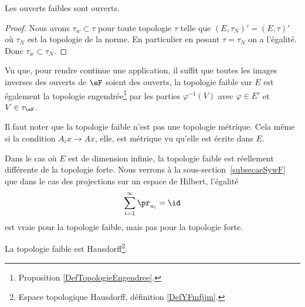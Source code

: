\begin{lemma}	\label{LEMooZPJNooJyaeAC}
	Les ouverts faibles sont ouverts.
\end{lemma}

\begin{proof}
	Nous avons \( \tau_w\subset \tau\) pour toute topologie \( \tau \) telle que \( (E,\tau_N)'=(E,\tau)'\) où \( \tau_N\) est la topologie de la norme. En particulier en posant \( \tau=\tau_N\) on a l'égalité. Donc \( \tau_w\subset\tau_N\).
\end{proof}

Vu que, pour rendre continue une application, il suffit que toutes les images inverses des ouverts de \( \eF\) soient des ouverts, la topologie faible sur \( E\) est également la topologie engendrée\footnote{Proposition \ref{DefTopologieEngendree}.} par les parties \( \varphi^{-1}(V)\) avec \( \varphi\in E'\) et \( V\in \tau_{\eF}\).

\begin{remark}
	Il faut noter que la topologie faible n'est pas une topologie métrique. Cela même si la condition \( A_ix\to Ax\), elle, est métrique vu qu'elle est écrite dans \( E\).

	Dans le cas où \( E\) est de dimension infinie, la topologie faible est réellement différente de la topologie forte. Nous verrons à la sous-section~\ref{subsecaeSywF} que dans le cas des projections sur un espace de Hilbert, l'égalité
	\begin{equation}
		\sum_{i=1}^{\infty}\pr_{u_i}=\id
	\end{equation}
	est vraie pour la topologie faible, mais pas pour la topologie forte.
\end{remark}

\begin{lemma}
	La topologie faible est Hausdorff\footnote{Espace topologique Hausdorff, définition \ref{DefYFmfjjm}.}.
\end{lemma}


